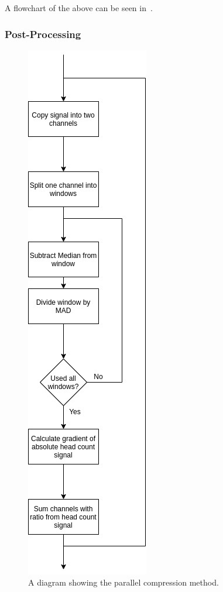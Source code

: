                     A flowchart of the above can be seen in~.
                
                \subsubsection{Post-Processing} \label{sec:pca_data_driven_surrogate_signal_extraction_methods_for_dynamic_pet_methods_post_processing}
                    \begin{figure}
                        \centering
                        
                        \includegraphics[width=0.3\linewidth]{figures/data_driven_surrogate_signal_extraction_methods_1_parallel_compression.png}
                        
                        \captionsetup{singlelinecheck=false, justification=centering}
                        \caption{A diagram showing the parallel compression method.}
                        \label{fig:pca_data_driven_surrogate_signal_extraction_methods_for_dynamic_pet_methods_parallel_compression}
                    \end{figure}
                    
